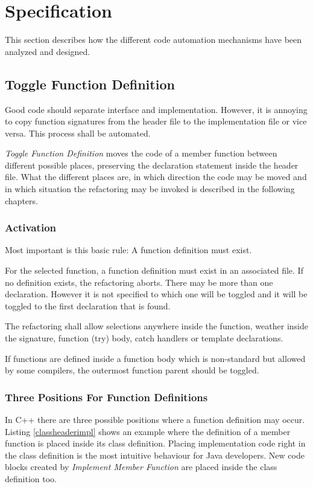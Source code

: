\chapter{Specification}
\thispagestyle{fancy}

This section describes how the different code automation mechanisms have been
analyzed and designed.

\section{Toggle Function Definition}

Good code should separate interface and implementation. However, it is 
annoying to copy function signatures from the header file to the implementation 
file or vice versa. This process shall be automated.

\textit{Toggle Function Definition} moves the code of a member function between 
different possible places, preserving the declaration statement inside the 
header file. What the different places are, in which direction the code may be 
moved and in which situation the refactoring may be invoked is described in the 
following chapters.

\subsection{Activation}

Most important is this basic rule: A function definition must exist.

For the selected function, a function definition must exist in an
associated file. If no definition exists, the refactoring aborts. There may be
more than one declaration. However it is not specified to which one will be
toggled and it will be toggled to the first declaration that is found.

The refactoring shall allow selections anywhere inside the function, weather 
inside the signature, function (try) body, catch handlers or template 
declarations.

If functions are defined inside a function body which is non-standard but
allowed by some compilers, the outermost function parent should be toggled.
\cite{GCC}

\subsection{Three Positions For Function Definitions}

\label{positions}
In C++ there are three possible positions where a function definition may occur.
Listing \ref{classheaderimpl} shows an example where the definition of a member
function is placed inside its class definition. Placing implementation code
right in the class definition is the most intuitive behaviour for Java
developers. New code blocks created by \textit{Implement Member Function} are
placed inside the class definition too.


